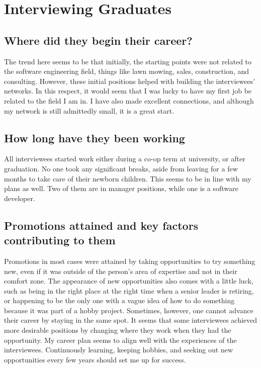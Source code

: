\section{Interviewing Graduates}
\subsection{Where did they begin their career?}
The trend here seems to be that initially, the starting points were not related
to the software engineering field, things like lawn mowing, sales,
construction, and consulting. However, these initial positions helped with
building the interviewees' networks. In this respect, it would seem that I was
lucky to have my first job be related to the field I am in. I have also made
excellent connections, and although my network is still admittedly small, it is
a great start.

\subsection{How long have they been working}
All interviewees started work either during a co-op term at university, or
after graduation. No one took any significant breaks, aside from leaving for a
few months to take care of their newborn children. This seems to be in line
with my plans as well. Two of them are in manager positions, while one is a
software developer. 

\subsection{Promotions attained and key factors contributing to them}
Promotions in most cases were attained by taking opportunities to try something
new, even if it was outside of the person's area of expertise and not in their
comfort zone. The appearance of new opportunities also comes with a little
luck, such as being in the right place at the right time when a senior leader
is retiring, or happening to be the only one with a vague idea of how to do
something because it was part of a hobby project. Sometimes, however, one
cannot advance their career by staying in the same spot. It seems that some
interviewees achieved more desirable positions by changing where they work when
they had the opportunity. My career plan seems to align well with the
experiences of the interviewees. Continuously learning, keeping hobbies, and
seeking out new opportunities every few years should set me up for success. 

